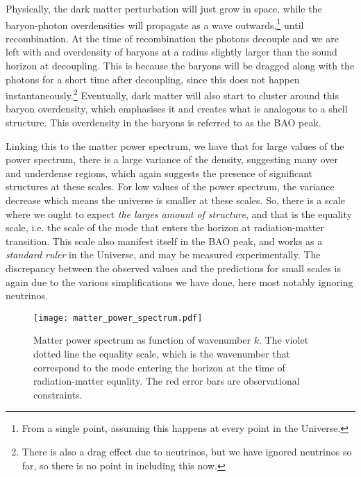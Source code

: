         Physically, the dark matter perturbation will just grow in space, while the baryon-photon overdensities will propagate as a wave outwards,\footnote{From a single point, assuming this happens at every point in the Universe.} until recombination. At the time of recombination the photons decouple and we are left with and overdensity of baryons at a radius slightly larger than the sound horizon at decoupling. This is because the baryons will be dragged along with the photons for a short time after decoupling, since this does not happen instantaneously.\footnote{There is also a drag effect due to neutrinos, but we have ignored neutrinos so far, so there is no point in including this now.} Eventually, dark matter will also start to cluster around this baryon overdensity, which emphasises it and creates what is analogous to a shell structure. This overdensity in the baryons is referred to as the BAO peak. 

        Linking this to the matter power spectrum, we have that for large values of the power spectrum, there is a large variance of the density, suggesting many over and underdense regions, which again suggests the presence of significant structures at these scales. For low values of the power spectrum, the variance decrease which means the universe is smaller at these scales. So, there is a scale where we ought to expect \textit{the larges amount of structure}, and that is the equality scale, i.e. the scale of the mode that enters the horizon at radiation-matter transition. This scale also manifest itself in the BAO peak, and works as a \textit{standard ruler} in the Universe, and may be measured experimentally. The discrepancy between the observed values and the predictions for small scales is again due to the various simplifications we have done, here most notably ignoring neutrinos.
    \begin{figure}
        \texttt{[image: matter\_power\_spectrum.pdf]}
        \caption{Matter power spectrum as function of wavenumber $k$. The violet dotted line the equality scale, which is the wavenumber that correspond to the mode entering the horizon at the time of radiation-matter equality. The red error bars are observational constraints.}
        \label{fig:m4:matter_power_spectrum}
    \end{figure}